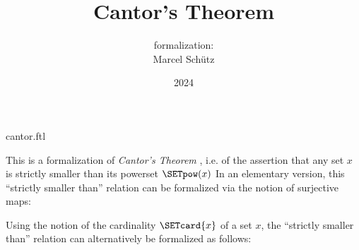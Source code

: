 \documentclass{article}
\title{Cantor's Theorem}
\author{\Naproche formalization: \vspace{0.5em} \\
Marcel Schütz}
\date{2024}
\begin{document}
\begin{smodule}{cantor.ftl}
  \maketitle
  \hidetlsnumbers


  \noindent This is a formalization of \emph{Cantor's Theorem}
  \cite{Cantor1891}, i.e. of the assertion that any set $x$ is strictly smaller
  than its powerset $\SETpow(x)$
  In an elementary version, this ``strictly smaller than'' relation can be
  formalized via the notion of surjective maps:
  
  \begin{forthel}
  \end{forthel}

  Using the notion of the cardinality $\SETcard{x}$ of a set $x$, the
  ``strictly smaller than'' relation can alternatively be formalized as follows:

  \begin{forthel}
  \end{forthel}

  \printbibliography
\end{smodule}
\end{document}
